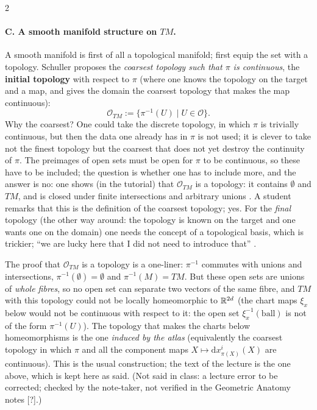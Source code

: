 \begin{paracol}{2}
\paragraph{C. A smooth manifold structure on $TM$.} A smooth manifold is first of all a topological manifold; first equip the set with a topology. Schuller proposes the \emph{coarsest topology such that $\pi$ is continuous}, the \textbf{initial topology} with respect to $\pi$ (where one knows the topology on the target and a map, and gives the domain the coarsest topology that makes the map continuous):
\[
  \mathcal O_{TM}:=\bigl\{\pi^{-1}(U)\mid U\in\mathcal O\bigr\}.
\]
Why the coarsest? One could take the discrete topology, in which $\pi$ is trivially continuous, but then the data one already has in $\pi$ is not used; it is clever to take not the finest topology but the coarsest that does not yet destroy the continuity of $\pi$. The preimages of open sets must be open for $\pi$ to be continuous, so these have to be included; the question is whether one has to include more,
and the answer is no: one shows (in the tutorial) that $\mathcal O_{TM}$ is a topology: it contains $\emptyset$ and $TM$, and is closed under finite intersections and arbitrary unions .
A student remarks that this is the definition of the coarsest topology; yes. For the \emph{final} topology (the other way around: the topology is known on the target and one wants one on the domain) one needs the concept of a topological basis, which is trickier; ``we are lucky here that I did not need to introduce that'' .
\begin{coursenote}
The proof that $\mathcal O_{TM}$ is a topology is a one-liner: $\pi^{-1}$ commutes with unions and intersections, $\pi^{-1}(\emptyset)=\emptyset$ and $\pi^{-1}(M)=TM$. But these open sets are unions of \emph{whole fibres}, so no open set can separate two vectors of the same fibre, and $TM$ with this topology could not be locally homeomorphic to $\mathbb{R}^{2d}$ (the chart maps $\xi_x$ below would not be continuous with respect to it: the open set $\xi_x^{-1}(\text{ball})$ is not of the form $\pi^{-1}(U)$). The topology that makes the charts below homeomorphisms is the one \emph{induced by the atlas}
(equivalently the coarsest topology in which $\pi$ and all the component maps $X\mapsto\mathrm dx^i_{\pi(X)}(X)$ are continuous). This is the usual construction; the text of the lecture is the one above, which is kept here as said. (Not said in class: a lecture error to be corrected; checked by the note-taker, not verified in the Geometric Anatomy notes [?].)
\end{coursenote}


\end{paracol}
